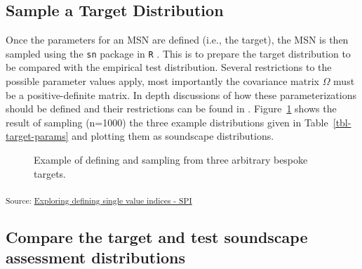 \documentclass[
  authoryear,
  preprint,
  3p]{elsarticle}
\begin{document}
\subsection{Sample a Target
Distribution}\label{sample-a-target-distribution}

Once the parameters for an MSN are defined (i.e., the target), the MSN
is then sampled using the \texttt{sn} package \citep{Azzalini2021R} in
\texttt{R} \citep{RCT2018R}. This is to prepare the target distribution
to be compared with the empirical test distribution. Several
restrictions to the possible parameter values apply, most importantly
the covariance matrix \(\Omega\) must be a positive-definite matrix. In
depth discussions of how these parameterizations should be defined and
their restrictions can be found in \citet{Azzalini2016How}.
Figure~\ref{fig-targets} shows the result of sampling (n=1000) the three
example distributions given in Table~\ref{tbl-target-params} and
plotting them as soundscape distributions.

\begin{figure}[H]


\caption{\label{fig-targets}Example of defining and sampling from three
arbitrary bespoke targets.}

\end{figure}%

\textsubscript{Source:
\href{https://MitchellAcoustics.github.io/J2401_JASA_SSID-Single-Index/notebooks/SingleIndex-Code.ipynb.html\#cell-fig-targets}{Exploring
defining single value indices - SPI}}

\subsection{Compare the target and test soundscape assessment
distributions}\label{compare-the-target-and-test-soundscape-assessment-distributions}
\end{document}

